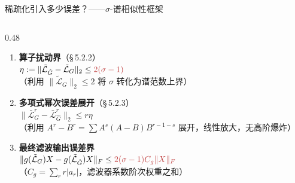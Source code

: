 \documentclass[aspectratio=169,9pt,xcolor=dvipsnames]{beamer}
\begin{document}
\begin{frame}{稀疏化引入多少误差？——$\sigma$-谱相似性框架}
\begin{columns}[T]
\begin{column}{0.48\textwidth}
\begin{enumerate}
    \item \textbf{算子扰动界}（§\,5.2.2）\\
      $\eta:=\|\tilde{\mathcal{L}}_{\hat{G}}-\tilde{\mathcal{L}}_G\|_2
       \le {\color{myred}2(\sigma-1)}$\\
       （利用 $\|\tilde{\mathcal{L}}_G\|_2\le 2$ 将 $\sigma$ 转化为谱范数上界）

    \item \textbf{多项式幂次误差展开}（§\,5.2.3）\\
      $\|\bar{\mathcal{L}}_G^r-\bar{\mathcal{L}}_{\hat{G}}^r\|_2\le r\eta$\\
       （利用 $A^r-B^r=\sum A^s(A-B)B^{r-1-s}$ 展开，线性放大，无高阶爆炸）

    \item \textbf{最终滤波输出误差界}\\
      $\|g(\tilde{\mathcal{L}}_G)X-g(\tilde{\mathcal{L}}_{\hat{G}})X\|_F
       \le {\color{myred}2(\sigma-1)C_g\|X\|_F}$\\
       （$C_g=\sum_{r}r|a_r|$，滤波器系数阶次权重之和）
  \end{enumerate}
\end{column}
\end{columns}
\end{frame}
\end{document}

